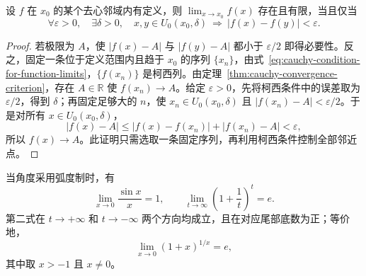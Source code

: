 \documentclass[UTF8,12pt,a4paper,fontset=fandol]{ctexbook}
\begin{document}
\begin{theorem}[函数极限的柯西收敛准则]
\label{thm:cauchy-criterion-for-function-limits}
设 $f$ 在 $x_0$ 的某个去心邻域内有定义，则 $\lim_{x\to x_0}f(x)$ 存在且有限，当且仅当
\begin{equation}
    \forall\varepsilon>0,\quad\exists\delta>0,\quad
    x,y\in U_0(x_0,\delta)\ \Longrightarrow\ |f(x)-f(y)|<\varepsilon.
    \label{eq:cauchy-condition-for-function-limits}
\end{equation}
\end{theorem}

\begin{proof}
若极限为 $A$，使 $|f(x)-A|$ 与 $|f(y)-A|$ 都小于 $\varepsilon/2$ 即得必要性。反之，固定一条位于定义范围内且趋于 $x_0$ 的序列 $\{x_n\}$，由式~\eqref{eq:cauchy-condition-for-function-limits}，$\{f(x_n)\}$ 是柯西列。由定理~\ref{thm:cauchy-convergence-criterion}，存在 $A\in\mathbb{R}$ 使 $f(x_n)\to A$。给定 $\varepsilon>0$，先将柯西条件中的误差取为 $\varepsilon/2$，得到 $\delta$；再固定足够大的 $n$，使 $x_n\in U_0(x_0,\delta)$ 且 $|f(x_n)-A|<\varepsilon/2$。于是对所有 $x\in U_0(x_0,\delta)$，
\[
    |f(x)-A|\leq|f(x)-f(x_n)|+|f(x_n)-A|<\varepsilon,
\]
所以 $f(x)\to A$。此证明只需选取一条固定序列，再利用柯西条件控制全部邻近点。
\end{proof}

\begin{theorem}[两个重要极限]
\label{thm:two-fundamental-function-limits}
当角度采用弧度制时，有
\begin{equation}
    \lim_{x\to0}\frac{\sin x}{x}=1,
    \qquad
    \lim_{t\to\infty}\left(1+\frac1t\right)^t=e.
    \label{eq:two-fundamental-function-limits}
\end{equation}
第二式在 $t\to+\infty$ 和 $t\to-\infty$ 两个方向均成立，且在对应尾部底数为正；等价地，
\begin{equation}
    \lim_{x\to0}(1+x)^{1/x}=e,
    \label{eq:fundamental-exponential-limit}
\end{equation}
其中取 $x>-1$ 且 $x\neq0$。
\end{theorem}
\end{document}

